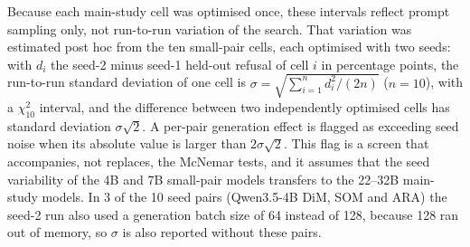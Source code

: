 Because each main-study cell was optimised once, these intervals reflect
prompt sampling only, not run-to-run variation of the search. That variation
was estimated post hoc from the ten small-pair cells, each optimised with two
seeds: with $d_i$ the seed-2 minus seed-1 held-out refusal of cell $i$ in
percentage points, the run-to-run standard deviation of one cell is
$\sigma=\sqrt{\sum_{i=1}^{n} d_i^2/(2n)}$ ($n=10$), with a $\chi^2_{10}$
interval, and the difference between two independently optimised cells has
standard deviation $\sigma\sqrt{2}$. A per-pair generation effect is flagged
as exceeding seed noise when its absolute value is larger than
$2\sigma\sqrt{2}$. This flag is a screen that accompanies, not replaces, the
McNemar tests, and it assumes that the seed variability of the 4B and 7B
small-pair models transfers to the 22--32B main-study models. In 3 of the 10
seed pairs (Qwen3.5-4B DiM, SOM and ARA) the seed-2 run also used a generation
batch size of 64 instead of 128, because 128 ran out of memory, so $\sigma$ is
also reported without these pairs.

